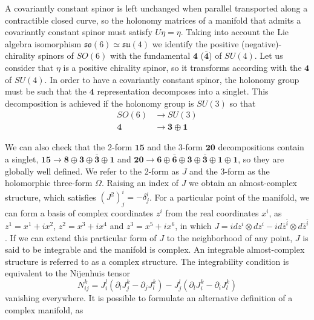 A covariantly constant spinor is left unchanged when parallel transported along a contractible
closed curve, so the holonomy matrices of a manifold that admits a covariantly constant spinor 
must satisfy $U\eta = \eta$.
Taking into account the Lie algebra isomorphism $\mathfrak{so}(6)\simeq \mathfrak{su}(4)$ we identify the positive
(negative)-chirality spinors of $SO(6)$ with the fundamental $\mathbf 4$ ($\mathbf {\bar 4}$)
of $SU(4)$.
Let us consider that $\eta$ is a positive chirality spinor, so it transforms according with the 
$\mathbf 4$ of $SU(4)$.
In order to have a covariantly constant spinor, the holonomy group must be such that the $\mathbf 4$
representation decomposes into a singlet.
This decomposition is achieved if the holonomy group is $SU(3)$ so that
 \begin{align}
  SO(6)  &\to SU(3)\\
  \mathbf 4 &\to \mathbf 3 \oplus \mathbf 1
\end{align} 


We can also check that the 2-form $\mathbf {15}$ and the 3-form $\mathbf{20}$ decompositions contain a singlet, 
$\mathbf {15}\to \mathbf 8\oplus \mathbf 3\oplus \bar {\mathbf 3}\oplus \mathbf 1$ and 
$\mathbf {20}\to \mathbf 6\oplus \bar{\mathbf 6}\oplus\mathbf 3\oplus \bar {\mathbf 3}\oplus \mathbf 1\oplus \mathbf 1$,
so they are globally well defined.
We refer to the 2-form as $J$ and the 3-form as the holomorphic three-form $\Omega$.
Raising an index of $J$ we obtain an almost-complex structure, which satisfies $(J^2)^i_j=-\delta^i_j$.
For a particular point of the manifold, we can form a basis of complex coordinates $z^i$ from the real coordinates $x^i$,
as $z^1=x^1+ix^2$, $z^2=x^3+ix^4$ and $z^3=x^5+ix^6$,
in which $J=idz^i\otimes dz^i - i d\bar z^{\bar i}\otimes d\bar z^{\bar i}$.
If we can extend this particular form of $J$ to the neighborhood of any point, $J$ is said to be integrable
and the manifold is complex.
An integrable almost-complex structure is referred to as a complex structure. 
The integrability condition is equivalent to the Nijenhuis tensor 
\begin{equation}
  N^k_{ij}= J^l_i(\partial_l J^k_j - \partial_j J^k_l) - J_j^l (\partial_l J^k_i - \partial_i J^k_l)
\end{equation}
vanishing everywhere.
It is possible to formulate an alternative definition of a complex manifold, as 

